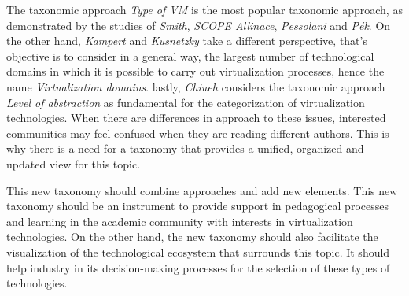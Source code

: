 	
	
	The taxonomic approach \textit{Type of VM} is the most popular taxonomic approach, as demonstrated by the studies of \textit{Smith}, \textit{SCOPE Allinace}, \textit{Pessolani} and \textit{Pék}. On the other hand, \textit{Kampert} and \textit{Kusnetzky} take a different perspective, that's objective is to consider in a general way, the largest number of technological domains in which it is possible to carry out virtualization processes, hence the name \textit{Virtualization domains}. lastly, \textit{Chiueh} considers the taxonomic approach \textit{Level of abstraction} as fundamental for the categorization of virtualization technologies. When there are differences in approach to these issues, interested communities may feel confused when they are reading different authors. This is why there is a need for a taxonomy that provides a unified, organized and updated view for this topic.
	
	
	This new taxonomy should combine approaches and add new elements. This new taxonomy should be an instrument to provide support in pedagogical processes and learning in the academic community with interests in virtualization technologies. On the other hand, the new taxonomy should also facilitate the visualization of the technological ecosystem that surrounds this topic. It should help industry in its decision-making processes for the selection of these types of technologies.
	
